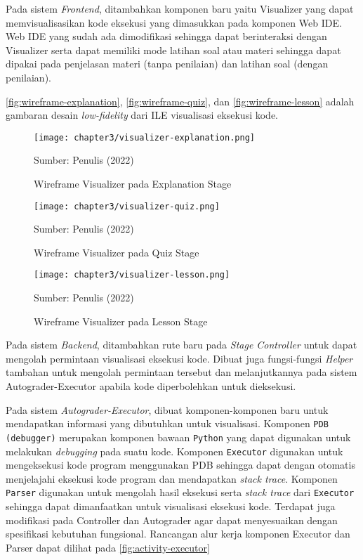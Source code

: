 Pada sistem \textit{Frontend}, ditambahkan komponen baru yaitu Visualizer yang dapat memvisualisasikan kode eksekusi yang dimasukkan pada komponen Web IDE. Web IDE yang sudah ada dimodifikasi sehingga dapat berinteraksi dengan Visualizer serta dapat memiliki mode latihan soal atau materi sehingga dapat dipakai pada penjelasan materi (tanpa penilaian) dan latihan soal (dengan penilaian).

\autoref{fig:wireframe-explanation}, \autoref{fig:wireframe-quiz}, dan \autoref{fig:wireframe-lesson} adalah gambaran desain \textit{low-fidelity} dari ILE visualisasi eksekusi kode.

\begin{figure}[!h]
  \centering
  \texttt{[image: chapter3/visualizer-explanation.png]}
  \caption{Wireframe Visualizer pada Explanation Stage} \label{fig:wireframe-explanation}
  Sumber: Penulis (2022)
\end{figure}

\begin{figure}[!h]
  \centering
  \texttt{[image: chapter3/visualizer-quiz.png]}
  \caption{Wireframe Visualizer pada Quiz Stage} \label{fig:wireframe-quiz}
  Sumber: Penulis (2022)
\end{figure}

\begin{figure}[!h]
  \centering
  \texttt{[image: chapter3/visualizer-lesson.png]}
  \caption{Wireframe Visualizer pada Lesson Stage} \label{fig:wireframe-lesson}
  Sumber: Penulis (2022)
\end{figure}

Pada sistem \textit{Backend}, ditambahkan rute baru pada \textit{Stage Controller} untuk dapat mengolah permintaan visualisasi eksekusi kode. Dibuat juga fungsi-fungsi \textit{Helper} tambahan untuk mengolah permintaan tersebut dan melanjutkannya pada sistem Autograder-Executor apabila kode diperbolehkan untuk dieksekusi.

Pada sistem \textit{Autograder-Executor}, dibuat komponen-komponen baru untuk mendapatkan informasi yang dibutuhkan untuk visualisasi. Komponen \verb|PDB (debugger)| merupakan komponen bawaan \verb|Python| yang dapat digunakan untuk melakukan \textit{debugging} pada suatu kode. Komponen \verb|Executor| digunakan untuk mengeksekusi kode program menggunakan PDB sehingga dapat dengan otomatis menjelajahi eksekusi kode program dan mendapatkan \textit{stack trace}. Komponen \verb|Parser| digunakan untuk mengolah hasil eksekusi serta \textit{stack trace} dari \verb|Executor| sehingga dapat dimanfaatkan untuk visualisasi eksekusi kode. Terdapat juga modifikasi pada Controller dan Autograder agar dapat menyesuaikan dengan spesifikasi kebutuhan fungsional. Rancangan alur kerja komponen Executor dan Parser dapat dilihat pada \autoref{fig:activity-executor}

